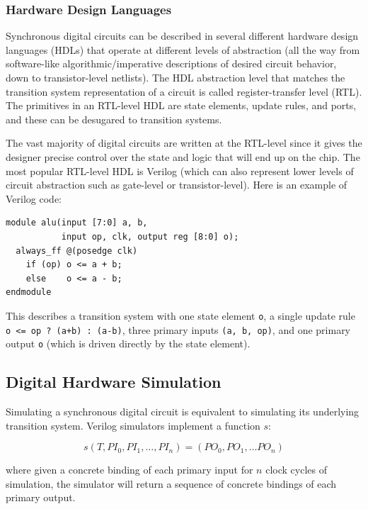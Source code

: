 \documentclass[sigconf,noacm]{acmart}
\begin{document}
\subsubsection{Hardware Design Languages}

Synchronous digital circuits can be described in several different hardware design languages (HDLs) that operate at different levels of abstraction (all the way from software-like algorithmic/imperative descriptions of desired circuit behavior, down to transistor-level netlists).
The HDL abstraction level that matches the transition system representation of a circuit is called register-transfer level (RTL).
The primitives in an RTL-level HDL are state elements, update rules, and ports, and these can be desugared to transition systems.

The vast majority of digital circuits are written at the RTL-level since it gives the designer precise control over the state and logic that will end up on the chip.
The most popular RTL-level HDL is Verilog (which can also represent lower levels of circuit abstraction such as gate-level or transistor-level).
Here is an example of Verilog code:

\begin{verbatim}
module alu(input [7:0] a, b,
           input op, clk, output reg [8:0] o);
  always_ff @(posedge clk)
    if (op) o <= a + b;
    else    o <= a - b;
endmodule
\end{verbatim}

This describes a transition system with one state element \texttt{o}, a single update rule \texttt{o <= op ? (a+b) : (a-b)}, three primary inputs \texttt{(a, b, op)}, and one primary output \texttt{o} (which is driven directly by the state element).

\subsection{Digital Hardware Simulation}

Simulating a synchronous digital circuit is equivalent to simulating its underlying transition system.
Verilog simulators implement a function $s$:

\begin{equation*}
  s(T, PI_0, PI_1, \dots, PI_n) = (PO_0, PO_1, \dots PO_n)
\end{equation*}

where given a concrete binding of each primary input for $n$ clock cycles of simulation, the simulator will return a sequence of concrete bindings of each primary output.
\end{document}

